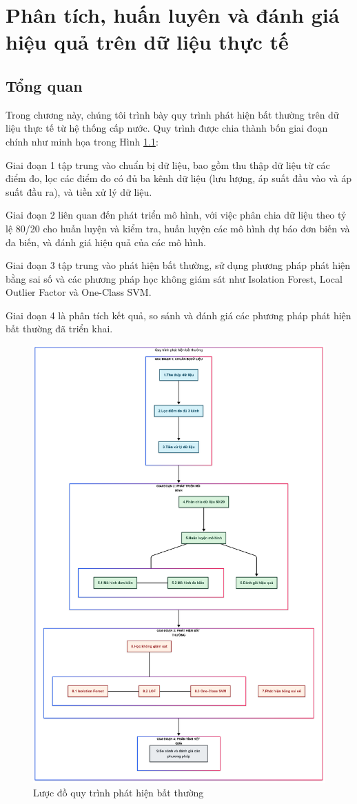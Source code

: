 \chapter{Phân tích, huấn luyên và đánh giá hiệu quả trên dữ liệu thực tế}
\section{Tổng quan}\label{ex-1}

Trong chương này, chúng tôi trình bày quy trình phát hiện bất thường trên dữ liệu thực tế từ hệ thống cấp nước. Quy trình được chia thành bốn giai đoạn chính như minh họa trong Hình \ref{fig:section6_1-experiment}:

Giai đoạn 1 tập trung vào chuẩn bị dữ liệu, bao gồm thu thập dữ liệu từ các điểm đo, lọc các điểm đo có đủ ba kênh dữ liệu (lưu lượng, áp suất đầu vào và áp suất đầu ra), và tiền xử lý dữ liệu.

Giai đoạn 2 liên quan đến phát triển mô hình, với việc phân chia dữ liệu theo tỷ lệ 80/20 cho huấn luyện và kiểm tra, huấn luyện các mô hình dự báo đơn biến và đa biến, và đánh giá hiệu quả của các mô hình.

Giai đoạn 3 tập trung vào phát hiện bất thường, sử dụng phương pháp phát hiện bằng sai số và các phương pháp học không giám sát như Isolation Forest, Local Outlier Factor và One-Class SVM.

Giai đoạn 4 là phân tích kết quả, so sánh và đánh giá các phương pháp phát hiện bất thường đã triển khai.

\begin{figure}[h!]
    \centering
    \includegraphics[width=\linewidth]{image/section6_1/luoc_do_nghien_cuu_real_dataset.png}
    \caption{Lược đồ quy trình phát hiện bất thường}
    \label{fig:section6_1-experiment}
\end{figure}
